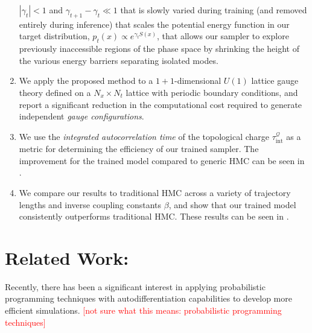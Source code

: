 \documentclass{article} %
\newcommand{\JCO}[1]{\textcolor{red}{[#1]}}
\begin{document}
\begin{enumerate}
      \(|\gamma_{t}|<1\) and \(\gamma_{t+1} - \gamma_{t} \ll 1\) that is slowly varied during training (and removed
      entirely during inference) that scales the potential energy function in our target distribution, \(p_{t}(x)\propto
      e^{\gamma_{t}S(x)}\), that allows our sampler to explore previously inaccessible regions of the phase space by
      shrinking the height of the various energy barriers separating isolated modes.
   \item We apply the proposed method to a \(1+1\)-dimensional \(U(1)\) lattice gauge theory defined on a
      \(N_{x}\times N_{t}\) lattice with periodic boundary conditions, and report a significant reduction in the
      computational cost required to generate independent \emph{gauge configurations}.
   \item We use the \emph{integrated autocorrelation time} of the topological charge
      \(\tau_{\mathrm{int}}^{\mathcal{Q}}\) as a metric for determining the efficiency of our trained sampler.
      The improvement for the trained model compared to generic HMC can be seen in .
   \item We compare our results to traditional HMC across a variety of trajectory lengths and inverse coupling
      constants \(\beta\), and show that our trained model consistently outperforms traditional HMC.\@
      These results can be seen in .
\end{enumerate}
%
\section{\label{sec:related_work}Related Work:}
Recently, there has been a significant interest in applying probabilistic programming techniques with
autodifferentiation capabilities to develop more efficient simulations.
\JCO{not sure what this means: probabilistic programming techniques}
%
\end{document}

